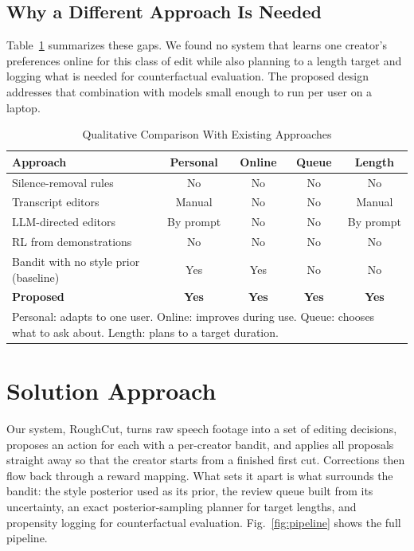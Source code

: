 \documentclass{ieeeaccess}
\begin{document}
\subsection{Why a Different Approach Is Needed}
Table~\ref{tab:qualitative} summarizes these gaps. We found no system that learns one creator's preferences online for this class of edit while also planning to a length target and logging what is needed for counterfactual evaluation. The proposed design addresses that combination with models small enough to run per user on a laptop.

\begin{table}[t]
\caption{Qualitative Comparison With Existing Approaches}
\label{tab:qualitative}
\setlength{\tabcolsep}{2.5pt}
\centering
\begin{tabular}{|p{33mm}|c|c|c|c|}
\hline
Approach & Personal & Online & Queue & Length \\
\hline
Silence-removal rules & No & No & No & No \\
Transcript editors \cite{berthouzoz2012,rubin2013} & Manual & No & No & Manual \\
LLM-directed editors \cite{wang2024lave,huh2025videodiff} & By prompt & No & No & By prompt \\
RL from demonstrations \cite{hu2023rlediting} & No & No & No & No \\
Bandit with no style prior (baseline) & Yes & Yes & No & No \\
\textbf{Proposed} & \textbf{Yes} & \textbf{Yes} & \textbf{Yes} & \textbf{Yes} \\
\hline
\multicolumn{5}{p{78mm}}{Personal: adapts to one user. Online: improves during use. Queue: chooses what to ask about. Length: plans to a target duration.}
\end{tabular}
\end{table}

\section{Solution Approach}
\label{sec:method}

Our system, RoughCut, turns raw speech footage into a set of editing decisions, proposes an action for each with a per-creator bandit, and applies all proposals straight away so that the creator starts from a finished first cut. Corrections then flow back through a reward mapping. What sets it apart is what surrounds the bandit: the style posterior used as its prior, the review queue built from its uncertainty, an exact posterior-sampling planner for target lengths, and propensity logging for counterfactual evaluation. Fig.~\ref{fig:pipeline} shows the full pipeline.
\end{document}
